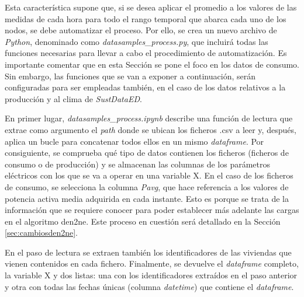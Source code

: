 Esta característica supone que, si se desea aplicar el promedio a los valores de las medidas de cada hora para todo el rango temporal que abarca cada uno de los nodos, se debe automatizar el proceso. Por ello, se crea un nuevo archivo de \textit{Python}, denominado como \textit{datasamples\_process.py}, que incluirá todas las funciones necesarias para llevar a cabo el procedimiento de automatización. Es importante comentar que en esta Sección se pone el foco en los datos de consumo. Sin embargo, las funciones que se van a exponer a continuación, serán configuradas para ser empleadas también, en el caso de los datos relativos a la producción y al clima de \textit{SustDataED}.

\vspace{3mm}

En primer lugar, \textit{datasamples\_process.ipynb} describe una función de lectura que extrae como argumento el \textit{path} donde se ubican los ficheros .csv a leer y, después, aplica un bucle para concatenar todos ellos en un mismo \textit{dataframe}. Por consiguiente, se comprueba qué tipo de datos contienen los ficheros (ficheros de consumo o de producción) y se almacenan las columnas de los parámetros eléctricos con los que se va a operar en una variable X. En el caso de los ficheros de consumo, se selecciona la columna \textit{Pavg}, que hace referencia a los valores de potencia activa media adquirida en cada instante. Esto es porque se trata de la información que se requiere conocer para poder establecer más adelante las cargas en el algoritmo \gls{den2ne}. Este proceso en cuestión será detallado en la Sección \ref{sec:cambiosden2ne}.

\vspace{3mm}

En el paso de lectura se extraen también los identificadores de las viviendas que vienen contenidos en cada fichero. Finalmente, se devuelve el \textit{dataframe} completo, la variable X y dos listas: una con los identificadores extraídos en el paso anterior y otra con todas las fechas únicas (columna \textit{datetime}) que contiene el \textit{dataframe}.

\vspace{3mm}


